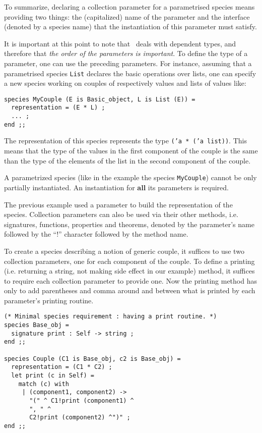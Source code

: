 To summarize, declaring a collection parameter for a parametrised
species means providing two things: the (capitalized) name of the
parameter and the interface (denoted by a species name) that the
instantiation of this parameter must satisfy.



\smallskip It is important at this point to note that \focal\ deals with
dependent types, and therefore that {\em
  the order of the parameters is important}. To define the type of a
parameter, one can use the preceding parameters. For instance, 
assuming that a parametrised species {\tt List} 
declares the basic operations over lists, one can specify a new
species working on couples of respectively values and lists of values
like: {\scriptsize
\begin{lstlisting}
species MyCouple (E is Basic_object, L is List (E)) =
  representation = (E * L) ;
  ... ;
end ;;
\end{lstlisting}
}

The representation of this species  represents the type
{\tt ('a * ('a list))}. This means that the type of the values in the
first component of the couple is the same than the type of the
elements of the list in the second component of the couple.


A parametrized species (like in
the example  the species {\tt MyCouple}) cannot be only partially
instantiated.  An
instantiation for {\bf all} its parameters is required. 


\medskip
\label{method-qualification}
The previous example  used
a parameter to build the representation of the species. 
Collection parameters can also be used via their other methods,
i.e. signatures, functions, properties and theorems, denoted by the
parameter's name followed by  the ``!''
character followed by the method name. 

To create a species describing a notion of generic couple, it suffices
to use two collection parameters, one for each component of the
couple. To define a printing (i.e. returning a string, not making side
effect in our example) method, it suffices to require each collection
parameter to provide one. Now the printing method has only to
add parentheses and comma around and between what is printed by each
parameter's printing routine.  
{\scriptsize
\begin{lstlisting}
(* Minimal species requirement : having a print routine. *)
species Base_obj =
  signature print : Self -> string ;
end ;;

species Couple (C1 is Base_obj, c2 is Base_obj) =
  representation = (C1 * C2) ;
  let print (c in Self) =
    match (c) with
     | (component1, component2) ->
       "(" ^ C1!print (component1) ^
       ", " ^
       C2!print (component2) ^")" ;
end ;;
\end{lstlisting}
}

